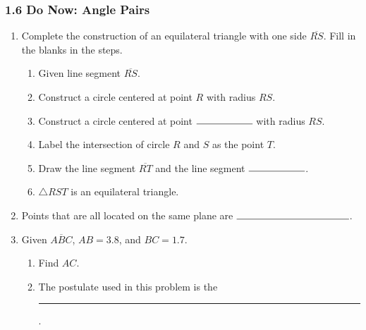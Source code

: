 \documentclass[12pt, twoside]{article}
\begin{document}
\subsubsection*{1.6 Do Now: Angle Pairs}
  \vspace{0.5cm}
  \begin{enumerate}

  \item Complete the construction of an equilateral triangle with one side $\overline{RS}$. Fill in the blanks in the steps.
    \begin{enumerate}
      \item Given line segment $\overline{RS}$. \bigskip
      \item Construct a circle centered at point $R$ with radius $RS$.  \bigskip
      \item Construct a circle centered at point $\rule{2cm}{0.15mm}$  with radius $RS$. \bigskip
      \item Label the intersection of circle $R$ and $S$ as the point $T$. \bigskip
      \item Draw the line segment $\overline{RT}$ and the line segment  $\rule{2cm}{0.15mm}$.
      \bigskip
      \item $\triangle RST$ is an equilateral triangle.
    \end{enumerate}
    \vspace{8cm}
    \begin{center}
    \end{center}

\newpage
  \item Points that are all located on the same plane are $\rule{4cm}{0.15mm}$. \bigskip

  \item Given $\overline{ABC}$, $AB=3.8$, and $BC=1.7$.
  \begin{enumerate}
    \item Find ${AC}$.\\[1.5cm]
       \vspace{2cm}
    \item The postulate used in this problem is the \rule{6cm}{0.15mm}.
  \end{enumerate}


\end{enumerate}
\end{document}
